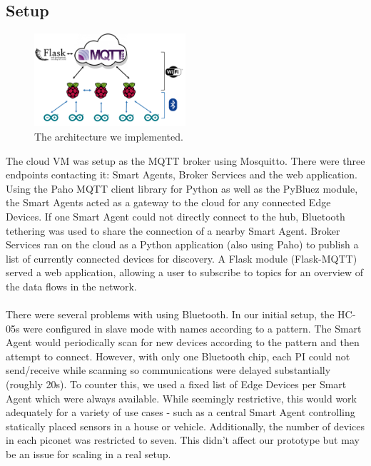 \subsection{Setup}

\begin{figure}
    \centering
    \includegraphics[width=0.5\textwidth]{Architecture.png}
    \caption{The architecture we implemented.}
    \label{fig:architecture}
\end{figure}

The cloud VM was setup as the MQTT broker using Mosquitto. There were three endpoints contacting it: Smart Agents, Broker Services and the web application. Using the Paho MQTT client library for Python as well as the PyBluez module, the Smart Agents acted as a gateway to the cloud for any connected Edge Devices. If one Smart Agent could not directly connect to the hub, Bluetooth tethering was used to share the connection of a nearby Smart Agent. Broker Services ran on the cloud as a Python application (also using Paho) to publish a list of currently connected devices for discovery. A Flask module (Flask-MQTT) served a web application, allowing a user to subscribe to topics for an overview of the data flows in the network.

\paragraph{}
There were several problems with using Bluetooth. In our initial setup, the HC-05s were configured in slave mode with names according to a pattern. The Smart Agent would periodically scan for new devices according to the pattern and then attempt to connect. However, with only one Bluetooth chip, each PI could not send/receive while scanning so communications were delayed substantially (roughly 20s). To counter this, we used a fixed list of Edge Devices per Smart Agent which were always available. While seemingly restrictive, this would work adequately for a variety of use cases - such as a central Smart Agent controlling statically placed sensors in a house or vehicle. Additionally, the number of devices in each piconet was restricted to seven. This didn't affect our prototype but may be an issue for scaling in a real setup.

